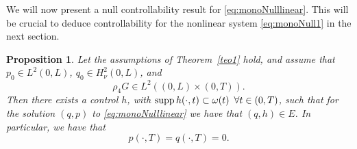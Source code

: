 \documentclass[10pt]{article}
\newtheorem{propo}{Proposition}
\def\om{\omega}
\begin{document}
	{ We will now present a null controllability result for \eqref{eq:monoNulllinear}. This will be crucial to deduce controllability for the nonlinear system \eqref{eq:monoNull1} in the next section.}
\begin{propo}\label{nullcontrol}
	Let the assumptions of Theorem~\emph{\ref{teo1}} hold, and assume that
	$p_0\in L^{2}(0,L)$, $q_0\in H^{2}_\nu(0,L)$, and
\begin{equation}\label{eq:G}
	\rho_4G\in L^2((0,L)\times(0,T)).
\end{equation}
	Then there exists a control $h$, with $\textnormal{supp}\,h(\cdot,t)\subset\om(t)\,~\forall t\in(0,T)$, such that for the solution $(q,p)$ to \eqref{eq:monoNulllinear}
	we have that $(q,h)\in E$.
	In particular, we have that
\begin{equation}\label{eq:nullcontrol_p_q}
	p(\cdot,T)=q(\cdot,T)=0.
\end{equation}
\end{propo}
\end{document}
